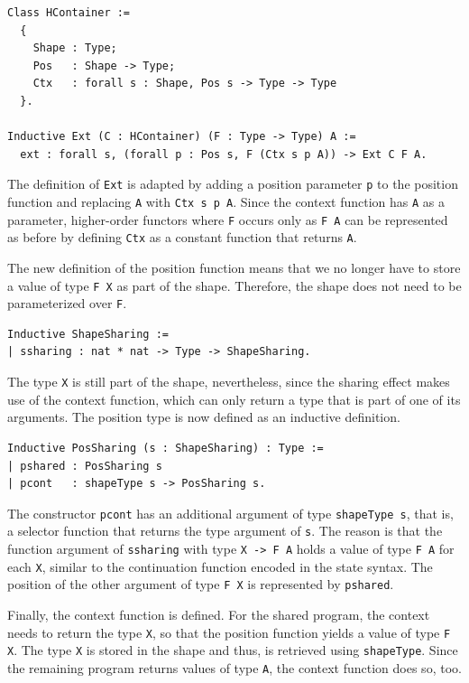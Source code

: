 \documentclass[a4paper, 11pt, fleqn, twoside, abstract=on]{scrreprt}
\newcommand{\hinl}[1]{\texttt{#1}}
\newcommand{\cinl}[1]{\texttt{#1}}
\begin{document}
\begin{verbatim}
Class HContainer :=
  {
    Shape : Type;
    Pos   : Shape -> Type;
    Ctx   : forall s : Shape, Pos s -> Type -> Type
  }.

Inductive Ext (C : HContainer) (F : Type -> Type) A :=
  ext : forall s, (forall p : Pos s, F (Ctx s p A)) -> Ext C F A.
\end{verbatim}

The definition of \cinl{Ext} is adapted by adding a position parameter \cinl{p} to the position function and replacing \cinl{A} with \cinl{Ctx s p A}.
Since the context function has \cinl{A} as a parameter, higher-order functors where \hinl{F} occurs only as \hinl{F A} can be represented as before by defining \cinl{Ctx} as a constant function that returns \cinl{A}.

The new definition of the position function means that we no longer have to store a value of type \cinl{F X} as part of the shape.
Therefore, the shape does not need to be parameterized over \cinl{F}.

\begin{verbatim}
Inductive ShapeSharing :=
| ssharing : nat * nat -> Type -> ShapeSharing.
\end{verbatim}
\noindent
The type \cinl{X} is still part of the shape, nevertheless, since the sharing effect makes use of the context function, which can only return a type that is part of one of its arguments.
The position type is now defined as an inductive definition.

\begin{verbatim}
Inductive PosSharing (s : ShapeSharing) : Type :=
| pshared : PosSharing s
| pcont   : shapeType s -> PosSharing s.
\end{verbatim}
\noindent
The constructor \cinl{pcont} has an additional argument of type \cinl{shapeType s}, that is, a selector function that returns the type argument of \cinl{s}.
The reason is that the function argument of \cinl{ssharing} with type \cinl{X -> F A} holds a value of type \cinl{F A} for each \cinl{X}, similar to the continuation function encoded in the state syntax.
The position of the other argument of type \cinl{F X} is represented by \cinl{pshared}.

Finally, the context function is defined.
For the shared program, the context needs to return the type \cinl{X}, so that the position function yields a value of type \cinl{F X}.
The type \cinl{X} is stored in the shape and thus, is retrieved using \cinl{shapeType}.
Since the remaining program returns values of type \cinl{A}, the context function does so, too.
\end{document}
